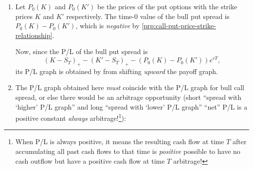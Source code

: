 \begin{enumerate}
\item Let \(P_0(K)\) and \(P_0(K')\) be the prices of the put options with the
strike prices \(K\) and \(K'\) respectively.  The time-0 value of the bull put
spread is \(P_0(K)-P_0(K')\), which is \emph{negative} by
\cref{prp:call-put-price-strike-relationship}.

Now, since the P/L of the bull put spread is
\[
(K-S_T)_{+}-(K'-S_T)_{+}-(P_0(K)-P_0(K'))e^{rT},
\]
its P/L graph is obtained by from shifting \emph{upward} the payoff graph.

\item The P/L graph obtained here \emph{must} coincide with the P/L graph for
bull call spread, or else there would be an arbitrage opportunity (short
``spread with `higher' P/L graph'' and long ``spread with `lower' P/L
graph''  ``net'' P/L is a positive constant
\emph{always}  arbitrage!\footnote{When P/L is always
positive, it means the resulting cash flow at time \(T\) after accumulating all
past cash flows to that time is \emph{positive}  possible
to have no cash outflow but have a positive cash flow at time \(T\)
 arbitrage!}):
\begin{center}


\end{center}
\end{enumerate}
